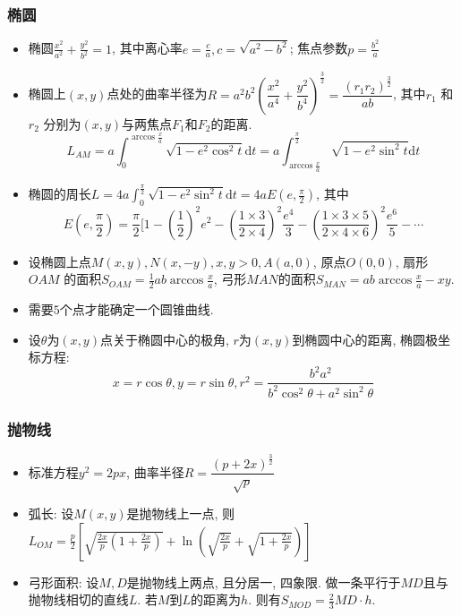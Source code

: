 \documentclass[landscape,a4paper]{article}
\begin{document}
\begin{spacing}{0.3}
\begin{multicols}{2}
\subsubsection{椭圆}
\begin{itemize}
\item 椭圆$\frac{x^2}{a^2} + \frac{y^2}{b^2} = 1$, 其中离心率$e = \frac{c}{a}, c = \sqrt{a^2 - b^2}$; 焦点参数$p = \frac{b^2}{a}$
\item 椭圆上$(x, y)$点处的曲率半径为$R = a^2 b^2 (\dfrac{x^2}{a^4} + \dfrac{y^2}{b^4})^\frac{3}{2} = \dfrac{(r_1 r_2)^\frac{3}{2}}{ab}$, 其中$r_1$ 和$r_2$ 分别为$(x, y)$与两焦点$F_1$和$F_2$的距离. %
  \[ L_{AM} = a \int_0^{\arccos{\frac{x}{a} }} \sqrt{1 - e^2 \cos^2 t} \textrm{d} t = a \int_{\arccos{\frac{x}{a} }}^\frac{\pi}{2} \sqrt{1 - e^2 \sin^2 t} \textrm{d} t\]
\item 椭圆的周长$L = 4a \int_0^{\frac{\pi}{2}} \sqrt{1 - e^2 \sin^2 t } \textrm{d} t = 4a E(e, \frac{\pi}{2})$, 其中
  \[ E(e, \frac{\pi}{2}) = \frac{\pi}{2} [ 1 - (\frac{1}{2})^2 e^2 - (\frac{1 \times 3}{2 \times 4})^2 \frac{e^4}{3} - (\frac{1 \times 3 \times 5}{2 \times 4 \times 6})^2 \frac{e^6}{5} - \cdots\]
\item 设椭圆上点$M(x, y), N(x, -y), x, y > 0, A(a, 0)$, 原点$O(0, 0)$, 扇形$OAM$ 的面积$S_{OAM} = \frac{1}{2} ab \arccos{\frac{x}{a}}$, 弓形$MAN$的面积$S_{MAN} = ab \arccos{\frac{x}{a}} - xy$.
\item 需要$5$个点才能确定一个圆锥曲线.
\item 设$\theta$为$(x, y)$点关于椭圆中心的极角, $r$为$(x, y)$到椭圆中心的距离, 椭圆极坐标方程:
  \[ x = r \cos \theta, y = r \sin \theta, r^2 = \frac{b^2 a^2}{b^2 \cos^2 \theta + a^2 \sin^2 \theta}\]
\end{itemize}

\subsubsection{抛物线}
\begin{itemize}
\item 标准方程$y^2 = 2px$, 曲率半径$ R = \dfrac{(p + 2x)^{\frac{3}{2} }}{\sqrt{p}}$
\item 弧长: 设$M(x, y)$是抛物线上一点, 则$L_{OM} = \frac{p}{2} [ \sqrt{\frac{2x}{p}(1 + \frac{2x}{p})} + \ln(\sqrt{\frac{2x}{p}} + \sqrt{1 + \frac{2x}{p}})]$
\item 弓形面积: 设$M, D$是抛物线上两点, 且分居一, 四象限. 做一条平行于$MD$且与抛物线相切的直线$L$. 若$M$到$L$的距离为$h$. 则有$S_{MOD} = \frac{2}{3}MD \cdot h$.
\end{itemize}


\end{multicols}
\end{spacing}
\end{document}
